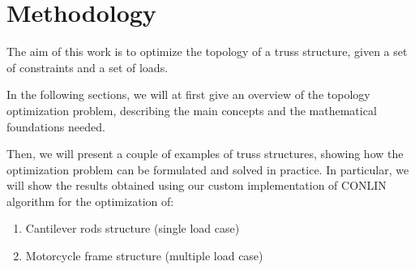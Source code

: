 \section{Methodology}
\label{sec:methodology}

The aim of this work is to optimize the topology of a truss structure, given a set of constraints and a set of loads.

In the following sections, we will at first give an overview of the topology optimization problem, describing the main concepts and the mathematical foundations needed.

Then, we will present a couple of examples of truss structures, showing how the optimization problem can be formulated and solved in practice.
In particular, we will show the results obtained using our custom implementation of CONLIN algorithm for the optimization of:

\begin{enumerate}
    \item Cantilever rods structure (single load case)
    \item Motorcycle frame structure (multiple load case)
\end{enumerate}